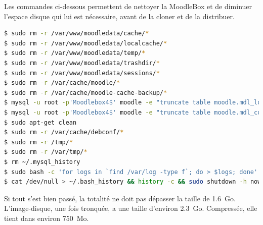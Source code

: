 \documentclass[11pt]{article}
\begin{document}
Les commandes ci-dessous permettent de nettoyer la MoodleBox et de diminuer l'espace disque qui lui est nécessaire, avant de la cloner et de la distribuer.

\begin{lstlisting}[language=bash]
$ sudo rm -r /var/www/moodledata/cache/*
$ sudo rm -r /var/www/moodledata/localcache/*
$ sudo rm -r /var/www/moodledata/temp/*
$ sudo rm -r /var/www/moodledata/trashdir/*
$ sudo rm -r /var/www/moodledata/sessions/*
$ sudo rm -r /var/cache/moodle/*
$ sudo rm -r /var/cache/moodle-cache-backup/*
$ mysql -u root -p'Moodlebox4$' moodle -e "truncate table moodle.mdl_logstore_standard_log"
$ mysql -u root -p'Moodlebox4$' moodle -e "truncate table moodle.mdl_config_log"
$ sudo apt-get clean
$ sudo rm -r /var/cache/debconf/*
$ sudo rm -r /tmp/*
$ sudo rm -r /var/tmp/*
$ rm ~/.mysql_history
$ sudo bash -c 'for logs in `find /var/log -type f`; do > $logs; done'
$ cat /dev/null > ~/.bash_history && history -c && sudo shutdown -h now
\end{lstlisting}

Si tout s'est bien passé, la totalité ne doit pas dépasser la taille de 1.6~Go. L'image-disque, une fois tronquée, a une taille d'environ 2.3~Go. Compressée, elle tient dans environ 750~Mo.
\end{document}
